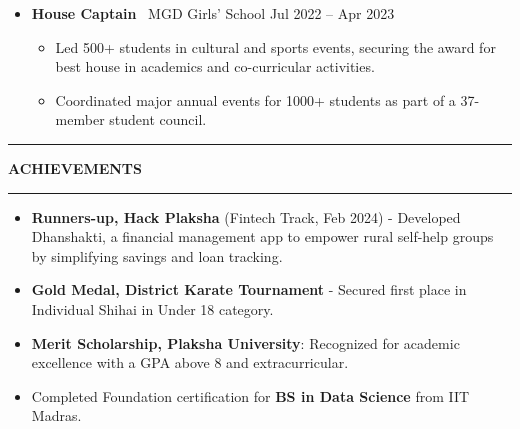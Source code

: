 \documentclass[letterpaper,9pt]{article}
\begin{document}
\begin{itemize}[leftmargin=0pt, parsep=0pt, itemsep=0.8em]
\item[] \textbf{House Captain} \textbar\ {MGD Girls' School} \hfill Jul 2022 -- Apr 2023
{\small
\begin{itemize}[leftmargin=1em, label=\textbullet, itemsep=0.2pt, parsep=0pt, topsep=1pt]
    \item Led 500+ students in cultural and sports events, securing the award for best house in academics and co-curricular activities.
    \item Coordinated major annual events for 1000+ students as part of a 37-member student council.
\end{itemize}
}

\end{itemize}

    


\vspace{0.7em}

\noindent
\begin{center}
    \rule[0.5ex]{0.38\linewidth}{0.5pt}
    \hspace{1em}
    \textbf{ACHIEVEMENTS}
    \hspace{1em}
    \rule[0.5ex]{0.38\linewidth}{0.5pt}
\end{center}

\begin{itemize}[leftmargin=1em, label=\textbullet, itemsep =0pt, parasep=0pt]
        \item \textbf{Runners-up, Hack Plaksha} (Fintech Track, Feb 2024) - Developed Dhanshakti, a financial management app to empower rural self-help groups by simplifying savings and loan tracking.
        \item \textbf{Gold Medal, District Karate Tournament} - Secured first place in Individual Shihai in Under 18 category.
        \item \textbf {Merit Scholarship, Plaksha University}: Recognized for academic excellence with a GPA above 8 and extracurricular.
        \item Completed Foundation certification for \textbf{BS in Data Science} from IIT Madras.

    \end{itemize}
\end{document}
